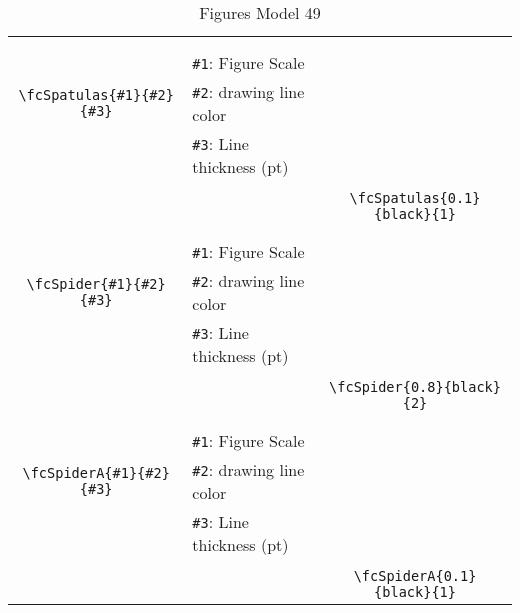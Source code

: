 \documentclass[x11names]{article}
\begin{document}
\begin{table}[H]
\begin{tabular}{|c|l|c|}
	&&\multirow{5}{*}{\fcSpatulas{0.1}{black}{1}}\\	&&\\	&\verb|#1|: Figure Scale &\\	\verb|\fcSpatulas{#1}{#2}{#3}|&	\verb|#2|: drawing line color &\\	&\verb|#3|: Line thickness (pt) &\\ &&\\&&	\verb|\fcSpatulas{0.1}{black}{1}|\\\hline 	
	&&\multirow{5}{*}{\fcSpider{0.8}{black}{2}}\\	&&\\	&\verb|#1|: Figure Scale &\\	\verb|\fcSpider{#1}{#2}{#3}|&	\verb|#2|: drawing line color &\\	&\verb|#3|: Line thickness (pt) &\\ &&\\&&	\verb|\fcSpider{0.8}{black}{2}|\\\hline 	
	&&\multirow{5}{*}{\fcSpiderA{0.1}{black}{1}}\\	&&\\	&\verb|#1|: Figure Scale &\\	\verb|\fcSpiderA{#1}{#2}{#3}|&	\verb|#2|: drawing line color &\\	&\verb|#3|: Line thickness (pt) &\\ &&\\&&	\verb|\fcSpiderA{0.1}{black}{1}|\\\hline 	\hline\end{tabular}\caption{Figures Model 49}\label{tab49}\end{table}
\end{document}
